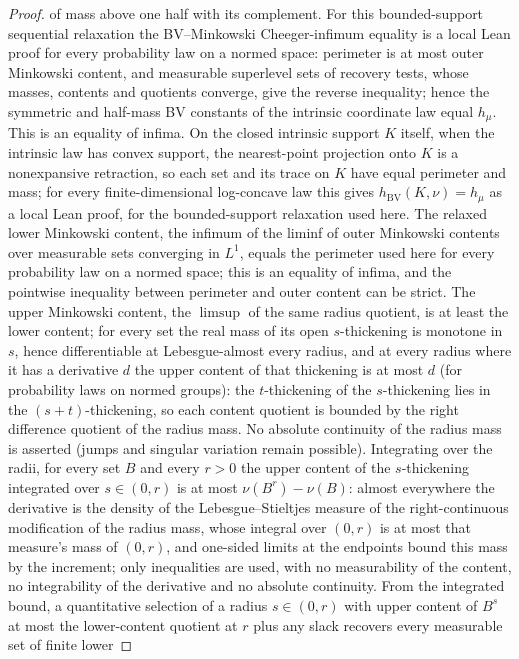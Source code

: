 \begin{proof}
  of mass above one half with its complement. For this bounded-support sequential relaxation the
  BV--Minkowski Cheeger-infimum equality is a local Lean proof for every probability
  law on a normed space: perimeter is at most outer Minkowski content, and measurable superlevel
  sets of recovery tests, whose masses, contents and quotients converge, give the reverse
  inequality; hence the symmetric and half-mass BV constants of the intrinsic coordinate law equal
  $h_\mu$. This is an equality of infima. On the closed intrinsic support $K$ itself, when the
  intrinsic law has convex support, the nearest-point projection onto $K$ is a nonexpansive
  retraction, so each set and its trace on $K$ have equal perimeter and mass; for every
  finite-dimensional log-concave law this gives $h_{\mathrm{BV}}(K,\nu)=h_\mu$ as a local Lean
  proof, for the bounded-support relaxation used here. The relaxed lower Minkowski
  content, the infimum of the liminf of outer Minkowski contents over measurable sets converging
  in $L^1$, equals the perimeter used here for every probability law on a normed space;
  this is an equality of infima, and the pointwise inequality between perimeter and
  outer content can be strict. The upper Minkowski content, the $\limsup$ of the same radius
  quotient, is at least the lower content; for every set the real mass of its open
  $s$-thickening is monotone in $s$, hence differentiable at Lebesgue-almost every radius, and at
  every radius where it has a derivative $d$ the upper content of that thickening is at most $d$
  (for probability laws on normed groups): the $t$-thickening of the $s$-thickening lies
  in the $(s+t)$-thickening, so each content quotient is bounded by the right difference quotient
  of the radius mass. No absolute continuity of the radius mass is asserted (jumps and singular
  variation remain possible). Integrating over the radii, for every set $B$ and every $r>0$ the
  upper content of the $s$-thickening integrated over $s\in(0,r)$ is at most $\nu(B^r)-\nu(B)$:
  almost everywhere the derivative is the density of the Lebesgue--Stieltjes
  measure of the right-continuous modification of the radius mass, whose integral over $(0,r)$
  is at most that measure's mass of $(0,r)$, and one-sided limits at the endpoints bound this
  mass by the increment; only inequalities are used, with no measurability of the content, no
  integrability of the derivative and no absolute continuity. From the integrated bound, a
  quantitative selection of a radius $s\in(0,r)$ with upper content of $B^s$ at most the
  lower-content quotient at $r$ plus any slack recovers every measurable set of finite lower

\end{proof}
